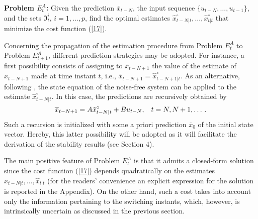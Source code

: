 \documentclass[11pt,journal,onecolumn]{IEEEtran}
\begin{document}
\textbf{Problem $E_{t}^{A}$:} Given the prediction $\overline{x}_{t-N}$, the input sequence $\{ u_{t-N}, \ldots, u_{t-1} \}$, and the sets $\mathfrak{I}^{i}_t , \, i = 1, \ldots, p$,  find the optimal estimates $\hat{x}^{\circ}_{t-N|t},\ldots,\hat{x}^{\circ}_{t|t}$ that minimize the cost function (\ref{17}). \vspace{.3cm}

Concerning the propagation of the estimation procedure from Problem $E_{t}^{A}$ to Problem $E_{t+1}^{A}$, different prediction strategies may be adopted.
For instance, a first possibility consists of assigning to $\overline{x}_{t-N+1}$ the value of the estimate of $x_{t-N+1}$ made at time instant $t$, i.e., $\bar{x}_{t-N+1} = \hat{x}^{\circ}_{t-N+1|t}$. As an alternative, following \cite{NLMHE}, the state equation of the noise-free system can be applied to the estimate $\hat{x}^{\circ}_{t-N|t}$. In this case, the predictions are recursively obtained by
\begin{equation}\label{18}
\overline{x}_{t-N+1}=A\hat{x}_{t-N|t}^{\circ}+Bu_{t-N},\hspace{3mm}t=N,N+1,\ldots \, .
\end{equation}
Such a recursion is initialized with some a priori prediction $\overline x_0$ of the initial state vector. Hereby, this latter possibility will be adopted as it will facilitate the derivation of the stability results (see Section 4).

The main positive feature of Problem $E_{t}^{A}$ is that it admits a closed-form solution since the cost function (\ref{17}) depends quadratically on the estimates $\hat{x}_{t-N|t},\ldots,\hat{x}_{t|t}$ (for the readers' convenience an explicit expression for the solution is reported in the Appendix). On the other hand, such a cost takes into account only the information pertaining to the switching instants, which, however, is intrinsically uncertain as discussed in the previous section.
\end{document}
